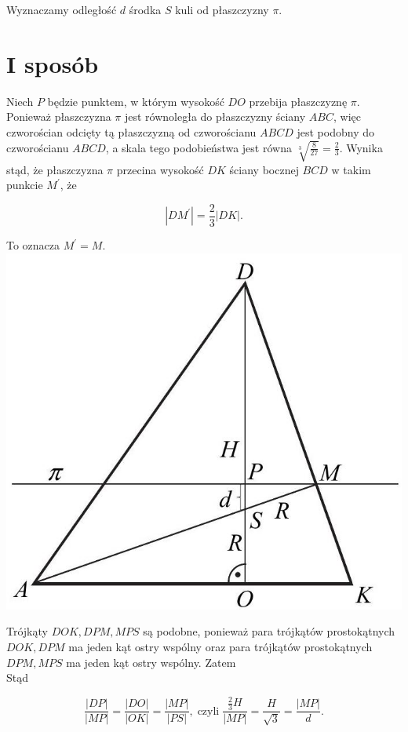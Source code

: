 \documentclass[10pt]{article}
\begin{document}
Wyznaczamy odległość $d$ środka $S$ kuli od płaszczyzny $\pi$.

\section*{I sposób}
Niech $P$ będzie punktem, w którym wysokość $D O$ przebija płaszczyznę $\pi$. Ponieważ płaszczyzna $\pi$ jest równoległa do płaszczyzny ściany $A B C$, więc czworościan odcięty tą płaszczyzną od czworościanu $A B C D$ jest podobny do czworościanu $A B C D$, a skala tego podobieństwa jest równa $\sqrt[3]{\frac{8}{27}}=\frac{2}{3}$. Wynika stąd, że płaszczyzna $\pi$ przecina wysokość $D K$ ściany bocznej $B C D$ w takim punkcie $M^{\prime}$, że

$$
\left|D M^{\prime}\right|=\frac{2}{3}|D K| .
$$

To oznacza $M^{\prime}=M$.\\
\includegraphics[max width=\textwidth, center]{2025_02_07_cd06b1485e4d114dda29g-13}

Trójkąty $D O K, D P M, M P S$ są podobne, ponieważ para trójkątów prostokątnych $D O K, D P M$ ma jeden kąt ostry wspólny oraz para trójkątów prostokątnych $D P M, M P S$ ma jeden kąt ostry wspólny. Zatem\\
Stąd

$$
\frac{|D P|}{|M P|}=\frac{|D O|}{|O K|}=\frac{|M P|}{|P S|}, \operatorname{czyli} \frac{\frac{2}{3} H}{|M P|}=\frac{H}{\sqrt{3}}=\frac{|M P|}{d} .
$$
\end{document}
